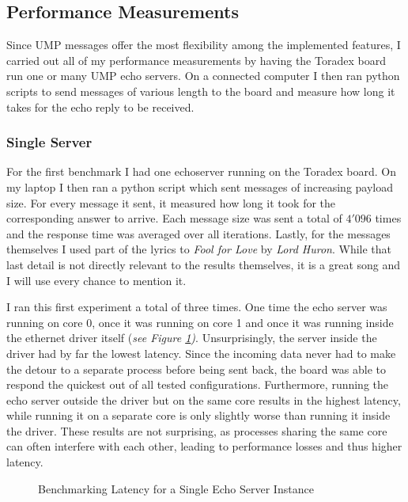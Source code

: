 \subsection{Performance Measurements}
Since UMP messages offer the most flexibility among the implemented features, I carried out all of my performance measurements by having the Toradex board run one or many UMP echo servers. On a connected computer I then ran python scripts to send messages of various length to the board and measure how long it takes for the echo reply to be received.

\subsubsection{Single Server}
For the first benchmark I had one echoserver running on the Toradex board. On my laptop I then ran a python script which sent messages of increasing payload size. For every message it sent, it measured how long it took for the corresponding answer to arrive. Each message size was sent a total of $4'096$ times and the response time was averaged over all iterations. Lastly, for the messages themselves I used part of the lyrics to \emph{Fool for Love} by \emph{Lord Huron}. While that last detail is not directly relevant to the results themselves, it is a great song and I will use every chance to mention it. 

I ran this first experiment a total of three times. One time the echo server was running on core 0, once it was running on core 1 and once it was running inside the ethernet driver itself (\emph{see Figure \ref{fig:single_echo})}. Unsurprisingly, the server inside the driver had by far the lowest latency. Since the incoming data never had to make the detour to a separate process before being sent back, the board was able to respond the quickest out of all tested configurations. Furthermore, running the echo server outside the driver but on the same core results in the highest latency, while running it on a separate core is only slightly worse than running it inside the driver. These results are not surprising, as processes sharing the same core can often interfere with each other, leading to performance losses and thus higher latency.

\begin{figure}[H]
\centering
    \resizebox{\textwidth}{!} {
        
    }
    \caption{Benchmarking Latency for a Single Echo Server Instance}
    \label{fig:single_echo}
\end{figure}

